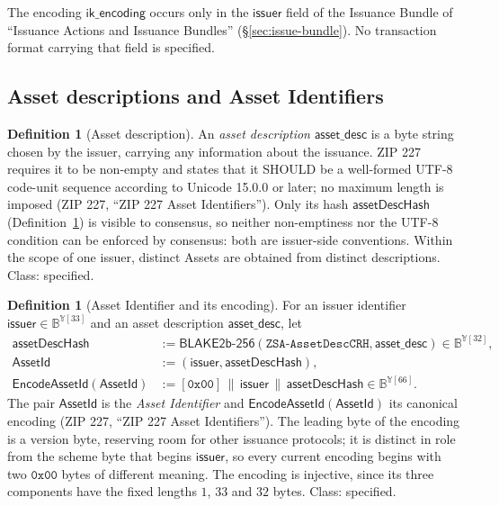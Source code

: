 \documentclass[11pt,a4paper]{article}
\theoremstyle{definition}
\newtheorem{definition}[theorem]{Definition}
\begin{document}
The encoding $\mathsf{ik\_encoding}$ occurs only in the $\mathsf{issuer}$
field of the Issuance Bundle of ``Issuance Actions and Issuance Bundles''
(\S\ref{sec:issue-bundle}). No transaction format carrying that field is
specified.

\subsection{Asset descriptions and Asset Identifiers}\label{sec:asset-id}

\begin{definition}[Asset description]\label{def:asset-desc}
An \emph{asset description} $\mathsf{asset\_desc}$ is a byte string chosen
by the issuer, carrying any information about the issuance. ZIP 227
requires it to be non-empty and states that it SHOULD be a well-formed UTF-8
code-unit sequence according to Unicode 15.0.0 or later; no maximum length is
imposed (ZIP 227, ``ZIP 227 Asset Identifiers''). Only its hash
$\mathsf{assetDescHash}$ (Definition~\ref{def:assetid}) is visible to
consensus, so neither non-emptiness nor the UTF-8 condition can be enforced
by consensus: both are issuer-side conventions. Within the scope of one
issuer, distinct Assets are obtained from distinct descriptions. Class:
specified.
\end{definition}

\begin{definition}[Asset Identifier and its encoding]\label{def:assetid}
For an issuer identifier $\mathsf{issuer} \in \mathbb{B}^{\mathbb{Y}[33]}$
and an asset description $\mathsf{asset\_desc}$, let
\begin{align*}
  \mathsf{assetDescHash} &:= \mathsf{BLAKE2b\text{-}256}(
    \texttt{ZSA-AssetDescCRH}, \mathsf{asset\_desc})
    \in \mathbb{B}^{\mathbb{Y}[32]}, \\
  \mathsf{AssetId} &:= (\mathsf{issuer}, \mathsf{assetDescHash}), \\
  \mathsf{EncodeAssetId}(\mathsf{AssetId}) &:= [\mathtt{0x00}] \,\|\,
    \mathsf{issuer} \,\|\, \mathsf{assetDescHash}
    \in \mathbb{B}^{\mathbb{Y}[66]}.
\end{align*}
The pair $\mathsf{AssetId}$ is the \emph{Asset Identifier} and
$\mathsf{EncodeAssetId}(\mathsf{AssetId})$ its canonical encoding (ZIP 227,
``ZIP 227 Asset Identifiers''). The leading byte of the encoding is a
version byte, reserving room for other issuance protocols; it is distinct in
role from the scheme byte that begins $\mathsf{issuer}$, so every current
encoding begins with two $\mathtt{0x00}$ bytes of different meaning. The
encoding is injective, since its three components have the fixed lengths
$1$, $33$ and $32$ bytes. Class: specified.
\end{definition}
\end{document}
